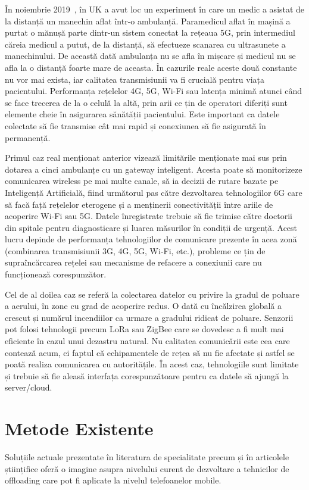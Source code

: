 \documentclass[12pt,a4paper]{report}
\begin{document}
În noiembrie 2019~\cite{use_case_ambulance}, în UK a avut loc un experiment în care un medic a asistat de la distanță un manechin aflat într-o ambulanță. Paramedicul aflat în mașină a purtat o mănușă parte dintr-un sistem conectat la rețeaua 5G, prin intermediul căreia medicul a putut, de la distanță, să efectueze scanarea cu ultrasunete a manechinului. De această dată ambulanța nu se afla în mișcare și medicul nu se afla la o distanță foarte mare de aceasta. În cazurile reale aceste două constante nu vor mai exista, iar calitatea transmisiunii va fi crucială pentru viața pacientului. Performanța rețelelor 4G, 5G, Wi-Fi sau latența minimă atunci când se face trecerea de la o celulă la altă, prin arii ce țin de operatori diferiți sunt elemente cheie în asigurarea sănătății pacientului. Este important ca datele colectate să fie transmise cât mai rapid și conexiunea să fie asigurată în permanență.

Primul caz real menționat anterior vizează limitările menționate mai sus prin dotarea a cinci ambulanțe cu un gateway inteligent. Acesta poate să monitorizeze comunicarea wireless pe mai multe canale, să ia decizii de rutare bazate pe Inteligență Artificială, fiind următorul pas către dezvoltarea tehnologiilor 6G care să facă față rețelelor eterogene și a menținerii conectivității între ariile de acoperire Wi-Fi sau 5G. Datele înregistrate trebuie să fie trimise către doctorii din spitale pentru diagnosticare și luarea măsurilor în condiții de urgență. Acest lucru depinde de performanța tehnologiilor de comunicare prezente în acea zonă (combinarea transmisiunii 3G, 4G, 5G, Wi-Fi, etc.), probleme ce țin de supraîncărcarea rețelei sau mecanisme de refacere a conexiunii care nu funcționează corespunzător.

Cel de al doilea caz se referă la colectarea datelor cu privire la gradul de poluare a aerului, în zone cu grad de acoperire redus. O dată cu încălzirea globală a crescut și numărul incendiilor ca urmare a gradului ridicat de poluare. Senzorii pot folosi tehnologii precum LoRa sau ZigBee care se dovedesc a fi mult mai eficiente în cazul unui dezastru natural. Nu calitatea comunicării este cea care contează acum, ci faptul că echipamentele de rețea să nu fie afectate și astfel se poată realiza comunicarea cu autoritățile. În acest caz, tehnologiile sunt limitate și trebuie să fie aleasă interfața corespunzătoare pentru ca datele să ajungă la server/cloud.

\chapter{Metode Existente}
Soluțiile actuale prezentate în literatura de specialitate precum și în articolele științifice oferă o imagine asupra nivelului curent de dezvoltare a tehnicilor de offloading care pot fi aplicate la nivelul telefoanelor mobile.
\end{document}
